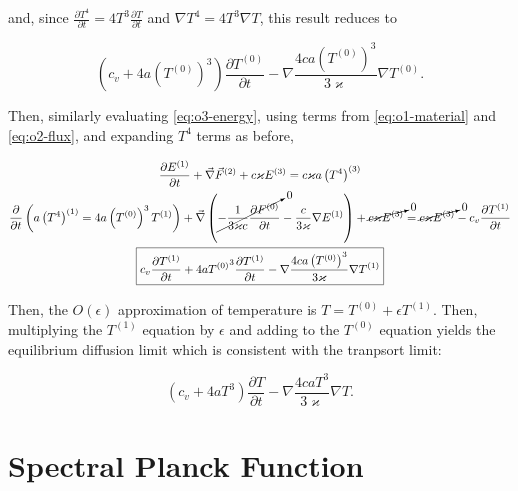 \documentclass{template}
\begin{document}
and, since $\frac{\partial T^4}{\partial t} = 4T^3\frac{\partial T}{\partial t}$ and $\nabla T^4 = 4T^3 \nabla T$, this result reduces to 

\begin{equation} 
  \boxed{ \left( c_v + 4a\left(T^{(0)} \right)^3 \right) \frac{\partial T^{(0)}}{\partial t}  - \nabla \frac{4ca \left(T^{(0)} \right)^3}{3\varkappa} \nabla T^{(0)}. }
\end{equation}


Then, similarly evaluating \autoref{eq:o3-energy}, using terms from \autoref{eq:o1-material} and \autoref{eq:o2-flux}, and expanding $T^4$ terms as before,


\begin{gather}
  \frac{\partial E^{(1)}}{\partial t} + \vec{\nabla}\vec{F}^{(2)} + c\varkappa E^{(3)} = c\varkappa a \left(T^4 \right)^{(3)}\\
  \frac{\partial }{\partial t} \left( a \left( T^4 \right)^{(1)}  = 4a \left( T^{(0)} \right)^3 T^{(1)}\right) + \vec{\nabla} \left(  \cancelto{0}{-\frac{1}{3\varkappa c} \frac{\partial F^{(0)}}{\partial t} }    - \frac{c}{3\varkappa} \nabla E^{(1)}  \right) + \cancelto{0}{c\varkappa E^{(3)}} = \cancelto{0}{c\varkappa E^{(3)}} - c_v \frac{\partial T^{(1)}}{\partial t}\\
  \boxed{c_v \frac{\partial T^{(1)}}{\partial t} + 4a {T^{(0)}}^3 \frac{\partial  T^{(1)}}{\partial t} - \nabla \frac{4ca \left(T^{(0)} \right)^3}{3\varkappa} \nabla T^{(1)}}  
\end{gather}

Then, the $O(\epsilon)$ approximation of temperature is $T = T^{(0)} + \epsilon T^{(1)}$. Then, multiplying the $T^{(1)}$ equation by $\epsilon$ and adding to the $T^{(0)}$ equation yields the equilibrium diffusion limit which is consistent with the tranpsort limit:

\begin{equation}
  \boxed{ \left( c_v + 4aT^3 \right) \frac{\partial T}{\partial t}  - \nabla \frac{4ca T^3}{3\varkappa} \nabla T. }
\end{equation}



\clearpage
\section{Spectral Planck Function}
\end{document}
